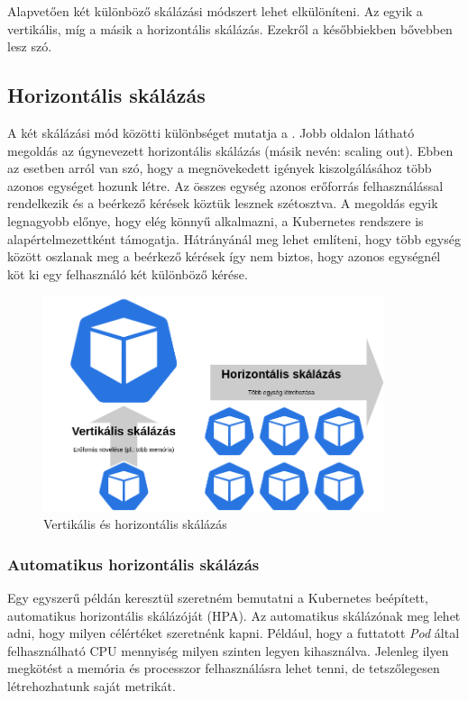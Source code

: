 Alapvetően két különböző skálázási módszert lehet elkülöníteni. Az egyik a vertikális, míg a másik a horizontális skálázás. Ezekről a későbbiekben bővebben lesz szó. 

\subsection{Horizontális skálázás}
A két skálázási mód közötti különbséget mutatja a . Jobb oldalon látható megoldás az úgynevezett horizontális skálázás (másik nevén: scaling out). Ebben az esetben arról van szó, hogy a megnövekedett igények kiszolgálásához több azonos egységet hozunk létre. Az összes egység azonos erőforrás felhasználással rendelkezik és a beérkező kérések köztük lesznek szétosztva. 
A megoldás egyik legnagyobb előnye, hogy elég könnyű alkalmazni, a Kubernetes rendszere is alapértelmezettként támogatja. Hátrányánál meg lehet említeni, hogy több egység között oszlanak meg a beérkező kérések így nem biztos, hogy azonos egységnél köt ki egy felhasználó két különböző kérése. 

\begin{figure}[!ht]
\centering
\includegraphics[width=100mm, keepaspectratio]{figures/scaling_types.png}
\caption{Vertikális és horizontális skálázás}
\label{fig:scaling}
\end{figure}

\subsubsection{Automatikus horizontális skálázás}
\label{subsec:hpa}
Egy egyszerű példán keresztül szeretném bemutatni a Kubernetes beépített, automatikus horizontális skálázóját (HPA). Az automatikus skálázónak meg lehet adni, hogy milyen célértéket szeretnénk kapni. Például, hogy a futtatott \textit{Pod} által felhasználható CPU mennyiség milyen szinten legyen kihasználva. Jelenleg ilyen megkötést a memória és processzor felhasználásra lehet tenni, de tetszőlegesen létrehozhatunk saját metrikát. 

